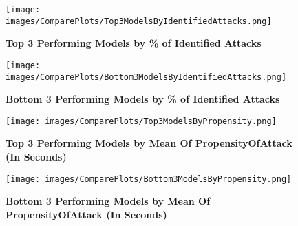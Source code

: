 \documentclass{article}
\begin{document}
    \begin{figure}[!ht]
        \caption{\textbf{Top 3 Performing Models by \% of Identified Attacks}}
        \label{fig:Top3ByIdentifiedAttacks}
            \texttt{[image: images/ComparePlots/Top3ModelsByIdentifiedAttacks.png]}
        \end{figure}

        \begin{figure}[h!]
        \caption{\textbf{Bottom 3 Performing Models by \% of Identified Attacks}}
        \label{fig:Bottom3ByIdentifiedAttacks}
            \texttt{[image: images/ComparePlots/Bottom3ModelsByIdentifiedAttacks.png]}
        \end{figure}


    \begin{figure}[!ht]
        \caption{\textbf{Top 3 Performing Models by Mean Of PropensityOfAttack (In Seconds)}}
        \label{fig:Top3ByPropensity}
            \texttt{[image: images/ComparePlots/Top3ModelsByPropensity.png]}
        \end{figure}

    \begin{figure}[!ht]
        \caption{\textbf{Bottom 3 Performing Models by Mean Of PropensityOfAttack (In Seconds)}}
        \label{fig:Bottom3ByPropensity}
            \texttt{[image: images/ComparePlots/Bottom3ModelsByPropensity.png]}
        \end{figure}
  
 \clearpage      
   
\end{document}
